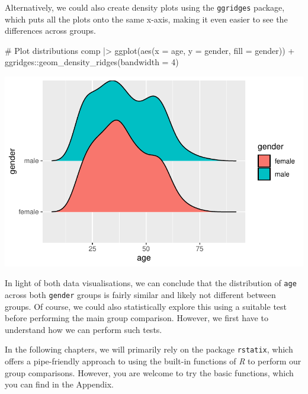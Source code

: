 \documentclass[
  letterpaper,
]{krantz}
\makeatletter
\newenvironment{Shaded}{\begin{snugshade}}{\end{snugshade}}
\newcommand{\AttributeTok}[1]{\textcolor[rgb]{0.40,0.45,0.13}{#1}}
\newcommand{\CommentTok}[1]{\textcolor[rgb]{0.37,0.37,0.37}{#1}}
\newcommand{\DecValTok}[1]{\textcolor[rgb]{0.68,0.00,0.00}{#1}}
\newcommand{\FunctionTok}[1]{\textcolor[rgb]{0.28,0.35,0.67}{#1}}
\newcommand{\NormalTok}[1]{\textcolor[rgb]{0.00,0.23,0.31}{#1}}
\newcommand{\SpecialCharTok}[1]{\textcolor[rgb]{0.37,0.37,0.37}{#1}}
\newenvironment{kframe}{%
\medskip{}
\setlength{\fboxsep}{.8em}
 \def\at@end@of@kframe{}%
 \ifinner\ifhmode%
  \def\at@end@of@kframe{\end{minipage}}%
  \begin{minipage}{\columnwidth}%
 \fi\fi%
 \def\FrameCommand##1{\hskip\@totalleftmargin \hskip-\fboxsep
 \colorbox{shadecolor}{##1}\hskip-\fboxsep
     \hskip-\linewidth \hskip-\@totalleftmargin \hskip\columnwidth}%
 \MakeFramed {\advance\hsize-\width
   \@totalleftmargin\z@ \linewidth\hsize
   \@setminipage}}%
 {\par\unskip\endMakeFramed%
 \at@end@of@kframe}
\renewenvironment{Shaded}{\begin{kframe}}{\end{kframe}}
\makeatother
\begin{document}
Alternatively, we could also create density plots using the
\texttt{ggridges} package, which puts all the plots onto the same
x-axis, making it even easier to see the differences across groups.

\begin{Shaded}
\begin{Highlighting}[]
\CommentTok{\# Plot distributions}
\NormalTok{comp }\SpecialCharTok{|\textgreater{}}
  \FunctionTok{ggplot}\NormalTok{(}\FunctionTok{aes}\NormalTok{(}\AttributeTok{x =}\NormalTok{ age,}
             \AttributeTok{y =}\NormalTok{ gender,}
             \AttributeTok{fill =}\NormalTok{ gender)) }\SpecialCharTok{+}
\NormalTok{  ggridges}\SpecialCharTok{::}\FunctionTok{geom\_density\_ridges}\NormalTok{(}\AttributeTok{bandwidth =} \DecValTok{4}\NormalTok{)}
\end{Highlighting}
\end{Shaded}

\includegraphics{11_group_comparison_files/figure-pdf/comparability-of-egyptians-plot-1.pdf}

In light of both data visualisations, we can conclude that the
distribution of \texttt{age} across both \texttt{gender} groups is
fairly similar and likely not different between groups. Of course, we
could also statistically explore this using a suitable test before
performing the main group comparison. However, we first have to
understand how we can perform such tests.

In the following chapters, we will primarily rely on the package
\texttt{rstatix}, which offers a pipe-friendly approach to using the
built-in functions of \emph{R} to perform our group comparisons.
However, you are welcome to try the basic functions, which you can find
in the Appendix.
\end{document}
